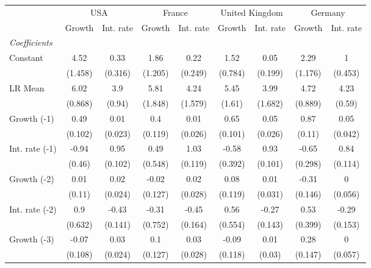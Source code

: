 \begin{table}[htbp] 
	\centering
	 \scriptsize
	\begin{tabular}{@{\extracolsep{4pt}}lcccccccc@{}}		\hline\hline
		 		 & \multicolumn{2}{c}{USA} &\multicolumn{2}{c}{France} &\multicolumn{2}{c}{United Kingdom} &\multicolumn{2}{c}{Germany} \\ 
 		 & Growth 	 & Int. rate 	 & Growth 	 & Int. rate 	 & Growth 	 & Int. rate 	 & Growth 	 & Int. rate\\\cline{2-3}\cline{4-5}\cline{6-7}\cline{8-9}
\rule{0pt}{4ex} 
 \emph{Coefficients} 	  		 & 		 & 		 & 		 & 		 & 		 & 		 & 		 &\\ 
\quad Constant 	 & 4.52 	 & 0.33 	 & 1.86 	 & 0.22 	 & 1.52 	 & 0.05 	 & 2.29 	 & 1	 \\ 
 		 & (1.458) 	 & (0.316) 	 & (1.205) 	 & (0.249) 	 & (0.784) 	 & (0.199) 	 & (1.176) 	 & (0.453) 	 \\ 
\quad LR Mean 	 & 6.02 	 & 3.9 	 & 5.81 	 & 4.24 	 & 5.45 	 & 3.99 	 & 4.72 	 & 4.23	 \\ 
 		 & (0.868) 	 & (0.94) 	 & (1.848) 	 & (1.579) 	 & (1.61) 	 & (1.682) 	 & (0.889) 	 & (0.59) 	 \\ 
\quad Growth (-1) 	 &0.49 	 & 0.01 	 & 0.4 	 & 0.01 	 & 0.65 	 & 0.05 	 & 0.87 	 & 0.05	 \\ 
 		 & (0.102) 	 & (0.023) 	 & (0.119) 	 & (0.026) 	 & (0.101) 	 & (0.026) 	 & (0.11) 	 & (0.042) 	 \\ 
\quad Int. rate (-1) 	 &-0.94 	 & 0.95 	 & 0.49 	 & 1.03 	 & -0.58 	 & 0.93 	 & -0.65 	 & 0.84	 \\ 
 		 & (0.46) 	 & (0.102) 	 & (0.548) 	 & (0.119) 	 & (0.392) 	 & (0.101) 	 & (0.298) 	 & (0.114) 	 \\ 
\quad Growth (-2) 	 &0.01 	 & 0.02 	 & -0.02 	 & 0.02 	 & 0.08 	 & 0.01 	 & -0.31 	 & 0	 \\ 
 		 & (0.11) 	 & (0.024) 	 & (0.127) 	 & (0.028) 	 & (0.119) 	 & (0.031) 	 & (0.146) 	 & (0.056) 	 \\ 
\quad Int. rate (-2) 	 &0.9 	 & -0.43 	 & -0.31 	 & -0.45 	 & 0.56 	 & -0.27 	 & 0.53 	 & -0.29	 \\ 
 		 & (0.632) 	 & (0.141) 	 & (0.752) 	 & (0.164) 	 & (0.554) 	 & (0.143) 	 & (0.399) 	 & (0.153) 	 \\ 
\quad Growth (-3) 	 &-0.07 	 & 0.03 	 & 0.1 	 & 0.03 	 & -0.09 	 & 0.01 	 & 0.28 	 & 0	 \\ 
 		 & (0.108) 	 & (0.024) 	 & (0.127) 	 & (0.028) 	 & (0.118) 	 & (0.03) 	 & (0.147) 	 & (0.057) 	 \\ 

\end{tabular}
\end{table}
